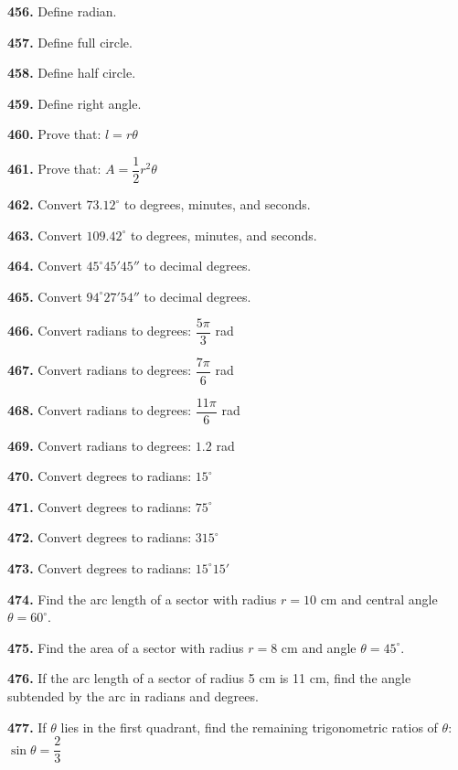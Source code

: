 \documentclass[11pt]{article}
\begin{document}
\bigskip
\noindent\textbf{456.} Define radian.

\bigskip
\noindent\textbf{457.} Define full circle.

\bigskip
\noindent\textbf{458.} Define half circle.

\bigskip
\noindent\textbf{459.} Define right angle.

\bigskip
\noindent\textbf{460.} Prove that: $l=r\theta$

\bigskip
\noindent\textbf{461.} Prove that: $A=\dfrac{1}{2}r^2\theta$

\bigskip
\noindent\textbf{462.} Convert $73.12^{\circ}$ to degrees, minutes, and seconds.

\bigskip
\noindent\textbf{463.} Convert $109.42^{\circ}$ to degrees, minutes, and seconds.

\bigskip
\noindent\textbf{464.} Convert $45^{\circ}45'45''$ to decimal degrees.

\bigskip
\noindent\textbf{465.} Convert $94^{\circ}27'54''$ to decimal degrees.

\bigskip
\noindent\textbf{466.} Convert radians to degrees: $\dfrac{5\pi}{3}$ rad

\bigskip
\noindent\textbf{467.} Convert radians to degrees: $\dfrac{7\pi}{6}$ rad

\bigskip
\noindent\textbf{468.} Convert radians to degrees: $\dfrac{11\pi}{6}$ rad

\bigskip
\noindent\textbf{469.} Convert radians to degrees: $1.2$ rad

\bigskip
\noindent\textbf{470.} Convert degrees to radians: $15^{\circ}$

\bigskip
\noindent\textbf{471.} Convert degrees to radians: $75^{\circ}$

\bigskip
\noindent\textbf{472.} Convert degrees to radians: $315^{\circ}$

\bigskip
\noindent\textbf{473.} Convert degrees to radians: $15^{\circ}15'$

\bigskip
\noindent\textbf{474.} Find the arc length of a sector with radius $r=10$ cm and central angle $\theta=60^{\circ}$.

\bigskip
\noindent\textbf{475.} Find the area of a sector with radius $r=8$ cm and angle $\theta=45^{\circ}$.

\bigskip
\noindent\textbf{476.} If the arc length of a sector of radius 5 cm is 11 cm, find the angle subtended by the arc in radians and degrees.

\bigskip
\noindent\textbf{477.} If $\theta$ lies in the first quadrant, find the remaining trigonometric ratios of $\theta$: $\sin\theta=\dfrac{2}{3}$
\end{document}
